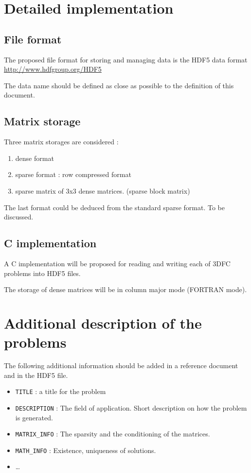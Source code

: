\documentclass[a4paper,10pt]{article}
\begin{document}
\section{Detailed implementation}

\subsection{File format}

The proposed file format for storing and managing data is the HDF5 data format\\
 \url{http://www.hdfgroup.org/HDF5}


\noindent The data name should be defined as close as possible to the definition of this document.

\subsection{Matrix storage}
Three matrix storages are considered :
\begin{enumerate}
\item dense format
\item sparse format : row compressed format
\item sparse matrix of 3x3 dense matrices. (sparse block matrix)
\end{enumerate}

The last format could be deduced from the standard sparse format. To be discussed. 


\subsection{C implementation}

A C implementation will be proposed for reading and writing each of 3DFC problems into HDF5 files.

The storage of dense matrices will be in column major mode (FORTRAN mode).
\clearpage

\section{Additional  description of the problems}

The following additional information should be added in a reference document and in the HDF5 file.


\begin{itemize}
\item \verb?TITLE? : a title for the problem
\item \verb?DESCRIPTION? : The field of application. Short description on how the problem is generated.
\item \verb?MATRIX_INFO? : The sparsity and the conditioning of the matrices.
\item \verb?MATH_INFO? : Existence, uniqueness of solutions.
\item \ldots
\end{itemize}
\end{document}

